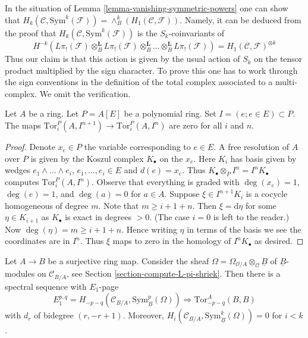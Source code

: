 \begin{remark}
\label{remark-first-homology-symmetric-power}
In the situation of Lemma \ref{lemma-vanishing-symmetric-powers}
one can show that
$H_k(\mathcal{C}, \text{Sym}^k(\mathcal{F})) =
\wedge^k_B(H_1(\mathcal{C}, \mathcal{F}))$.
Namely, it can be deduced from the proof that
$H_k(\mathcal{C}, \text{Sym}^k(\mathcal{F}))$ is the $S_k$-coinvariants
of
$$
H^{-k}(L\pi_!(\mathcal{F}) \otimes_B^\mathbf{L}
L\pi_!(\mathcal{F}) \otimes_B^\mathbf{L}
\ldots \otimes_B^\mathbf{L} L\pi_!(\mathcal{F})) =
H_1(\mathcal{C}, \mathcal{F})^{\otimes k}
$$
Thus our claim is that this action is given by the usual action
of $S_k$ on the tensor product multiplied by the sign character.
To prove this one has to work through the sign conventions
in the definition of the total complex associated to a
multi-complex. We omit the verification.
\end{remark}

\begin{lemma}
\label{lemma-map-tors-zero}
Let $A$ be a ring. Let $P = A[E]$ be a polynomial ring.
Set $I = (e; e \in E) \subset P$. The maps
$\text{Tor}_i^P(A, I^{n + 1}) \to \text{Tor}_i^P(A, I^n)$
are zero for all $i$ and $n$.
\end{lemma}

\begin{proof}
Denote $x_e \in P$ the variable corresponding to $e \in E$.
A free resolution of $A$ over $P$ is given by the Koszul complex
$K_\bullet$ on the $x_e$. Here $K_i$ has basis given by wedges
$e_1 \wedge \ldots \wedge e_i$, $e_1, \ldots, e_i \in E$ and $d(e) = x_e$.
Thus $K_\bullet \otimes_P I^n = I^nK_\bullet$ computes
$\text{Tor}_i^P(A, I^n)$. Observe that everything is graded
with $\deg(x_e) = 1$, $\deg(e) = 1$, and $\deg(a) = 0$ for $a \in A$.
Suppose $\xi \in I^{n + 1}K_i$ is a cocycle homogeneous of degree $m$.
Note that $m \geq i + 1 + n$. Then $\xi = \text{d}\eta$ for some
$\eta \in K_{i + 1}$ as $K_\bullet$ is exact in degrees $ > 0$.
(The case $i = 0$ is left to the reader.)
Now $\deg(\eta) = m \geq i + 1 + n$. Hence writing $\eta$
in terms of the basis we see the coordinates are in $I^n$.
Thus $\xi$ maps to zero in the homology of $I^nK_\bullet$ as desired.
\end{proof}

\begin{theorem}
\label{theorem-quillen-spectral-sequence}
Let $A \to B$ be a surjective ring map. Consider the sheaf
$\Omega = \Omega_{\mathcal{O}/A} \otimes_\mathcal{O} \underline{B}$ of
$\underline{B}$-modules on $\mathcal{C}_{B/A}$, see
Section \ref{section-compute-L-pi-shriek}.
Then there is a spectral sequence with $E_1$-page
$$
E_1^{p, q} =
H_{- p - q}(\mathcal{C}_{B/A}, \text{Sym}^p_{\underline{B}}(\Omega))
\Rightarrow \text{Tor}^A_{- p - q}(B, B)
$$
with $d_r$ of bidegree $(r, -r + 1)$.
Moreover, $H_i(\mathcal{C}_{B/A}, \text{Sym}^k_{\underline{B}}(\Omega)) = 0$
for $i < k$.
\end{theorem}

